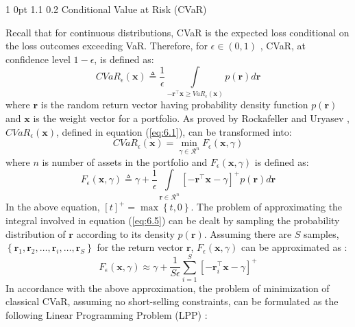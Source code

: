 \documentclass[12pt]{article}
\makeatletter
\numberwithin{equation}{section}
\renewcommand{\subsection}{
  \@startsection
  {subsection}%
  {1}%
  {0pt}%
  {1.1\baselineskip}%
  {0.2\baselineskip}%
  {\sc \centering}%
}
\makeatother
\begin{document}
\subsection {Conditional Value at Risk (CVaR)}

Recall that for continuous distributions, CVaR is the expected loss conditional on the loss outcomes exceeding VaR.
Therefore, for $\epsilon \in (0,1)$ , CVaR, at confidence level $1-\epsilon$, is defined as:
\begin{equation}
CVaR_{\epsilon}(\mathbf{x}) \triangleq \frac{1}{\epsilon} \int \limits_{-\mathbf{r}^{\top}\mathbf{x} \geq VaR_{\epsilon}(\mathbf{x})}
p(\mathbf{r}) d\mathbf{r}
\label{eq:6.1}
\end{equation}
where $\mathbf{r}$ is the random return vector having probability density function $p(\mathbf{r})$ and $\mathbf{x}$ is the weight vector for a portfolio.
As proved by Rockafeller and Uryasev \cite{rockafellar1} , $CVaR_{\epsilon}(\mathbf{x})$, defined in equation (\ref{eq:6.1}), can be transformed into:
\begin{equation}
CVaR_{\epsilon}(\mathbf{x})=\min_{\gamma \in \mathcal{R}^{n}} F_{\epsilon}(\mathbf{x},\gamma)
\label{eq:6.4}
\end{equation}
where $n$ is number of assets in the portfolio and $F_{\epsilon}(\mathbf{x},\gamma)$ is defined as:
\begin{equation}
F_{\epsilon}(\mathbf{x},\gamma) \triangleq \gamma+\frac{1}{\epsilon} \int \limits_{\mathbf{r} \in \mathcal{R}^{n}}
\left[-\mathbf{r}^{\top}\mathbf{x}-\gamma\right]^{+} p(\mathbf{r}) d\mathbf{r}
\label{eq:6.5}
\end{equation}
In the above equation, $\left[t\right]^{+}=\max \left\{t,0\right\}$. The problem of approximating the integral involved in equation (\ref{eq:6.5})
can be dealt by sampling the probability distribution of $\mathbf{r}$ according to its density $p(\mathbf{r})$. Assuming there are $S$ samples,
$\displaystyle{\left\{\mathbf{r}_{1},\mathbf{r}_{2},\dots,\mathbf{r}_{i},\dots,\mathbf{r}_{S}\right\}}$ for the return vector $\mathbf{r}$,
$F_{\epsilon}(\mathbf{x},\gamma)$ can be approximated as \cite{rockafellar1}:
\begin{equation}
F_{\epsilon}(\mathbf{x},\gamma) \approx \gamma+\frac{1}{S\epsilon}\sum\limits_{i=1}^{S} \left[-\mathbf{r}_{i}^{\top}\mathbf{x}-\gamma\right]^{+}
\label{eq:6.6}
\end{equation}
In accordance with the above approximation, the problem of minimization of classical CVaR, assuming no short-selling constraints, can be formulated as the following Linear Programming Problem (LPP) \cite{rockafellar1,zhu}:
\end{document}

